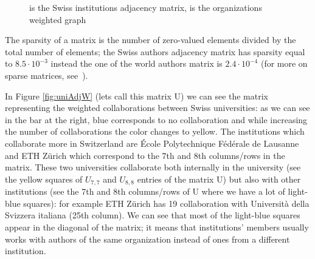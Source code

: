 \documentclass[]{usiinfbachelorproject}
\begin{document}
\begin{figure}[tb]
	\centering
	\caption{  is the Swiss institutions adjacency matrix,  is the organizations weighted graph}
	\label{fig:univAdj}
\end{figure}

The sparsity of a matrix is the number of zero-valued elements divided by the total number of elements; the Swiss authors adjacency matrix has sparsity equal to $8.5 \cdot 10^{-3}$ instead the one of the world authors matrix is $2.4 \cdot 10^{-4}$ (for more on sparse matrices, see~\cite[Chapter 3]{saad}).

In Figure \ref{fig:uniAdjW} (lets call this matrix U) we can see the matrix representing the weighted collaborations between Swiss universities: as we can see in the bar at the right, blue corresponds to no collaboration and while increasing the number of collaborations the color changes to yellow.
The institutions which collaborate more in Switzerland are \'{E}cole Polytechnique F\'{e}d\'{e}rale de Lausanne and ETH Z\"{u}rich which correspond to the 7th and 8th columns/rows in the matrix. These two universities collaborate both internally in the university (see the yellow squares of $U_{7,7}$ and $U_{8,8}$ entries of the matrix U)  but also with other institutions (see the 7th and 8th columns/rows of U where we have a lot of light-blue squares): for example  ETH Z\"{u}rich has 19 collaboration with Universit\`{a} della Svizzera italiana (25th column). 
We can see that most of the light-blue squares appear in the diagonal of the matrix; it means that institutions' members usually works with authors of the same organization instead of ones from a different institution.
\end{document}
